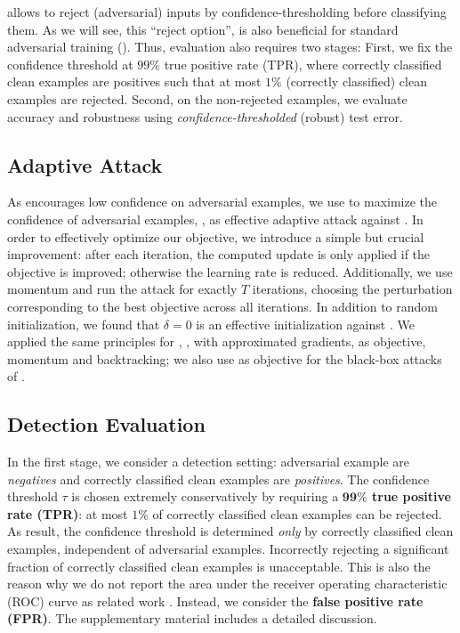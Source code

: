 \ConfTrain allows to reject (adversarial) inputs by confidence-thresholding before classifying them. As we will see, this ``reject option'', is also beneficial for standard adversarial training (\AdvTrain). Thus, evaluation also requires two stages: First, we fix the confidence threshold at $99\%$ true positive rate (TPR), where correctly classified clean examples are positives such that at most $1\%$ (correctly classified) clean examples are rejected.
Second, on the non-rejected examples, we evaluate accuracy and robustness using \emph{confidence-thresholded} (robust) test error. 

\subsection{Adaptive Attack}
\label{subsec:evaluation-attack}

As \ConfTrain encourages low confidence on adversarial examples, we use \PGD to maximize the confidence of adversarial examples, \cf {}, as effective adaptive attack against \ConfTrain. In order to effectively optimize our objective, we introduce a simple but crucial improvement: after each iteration, the computed update is only applied if the objective is improved; otherwise the learning rate is reduced.
Additionally, we use momentum \citep{DongCVPR2018} and run the attack for exactly $T$ iterations, choosing the perturbation corresponding to the best objective across all iterations. In addition to random initialization, we found that $\delta = 0$ is an effective initialization against \ConfTrain. We applied the same principles for \cite{IlyasICML2018}, \ie, \PGD with approximated gradients,  as objective, momentum and backtracking; we also use  as objective for the black-box attacks of \cite{AndriushchenkoARXIV2019,NarodytskaCVPRWORK2017,KhouryARXIV2018}.

\subsection{Detection Evaluation}

In the first stage, we consider a detection setting: adversarial example are \emph{negatives} and correctly classified clean examples are \emph{positives}. The confidence threshold $\tau$ is chosen extremely conservatively by requiring a \textbf{$\boldsymbol{99\%}$ true positive rate (TPR)}: at most $1\%$ of correctly classified clean examples can be rejected. As result, the confidence threshold is determined \emph{only} by correctly classified clean examples, independent of adversarial examples. Incorrectly rejecting a significant fraction of correctly classified clean examples is unacceptable. This is also the reason why we do not report the area under the receiver operating characteristic (ROC) curve as related work \citep{LeeNIPS2018,MaICLR2018}.
Instead, we consider the \textbf{false positive rate (FPR)}.
The supplementary material includes a detailed discussion.


